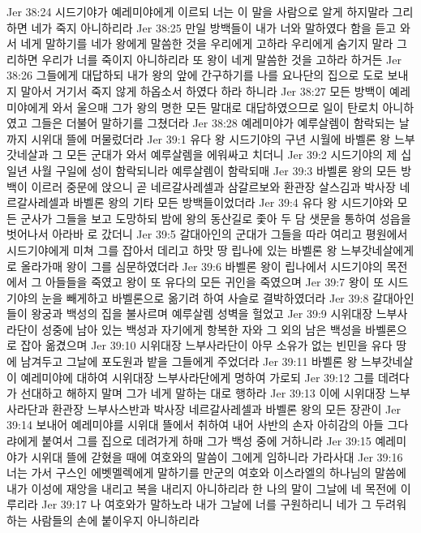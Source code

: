 Jer 38:24  시드기야가 예레미야에게 이르되 너는 이 말을 사람으로 알게 하지말라 그리하면 네가 죽지 아니하리라
Jer 38:25  만일 방백들이 내가 너와 말하였다 함을 듣고 와서 네게 말하기를 네가 왕에게 말씀한 것을 우리에게 고하라 우리에게 숨기지 말라 그리하면 우리가 너를 죽이지 아니하리라 또 왕이 네게 말씀한 것을 고하라 하거든
Jer 38:26  그들에게 대답하되 내가 왕의 앞에 간구하기를 나를 요나단의 집으로 도로 보내지 말아서 거기서 죽지 않게 하옵소서 하였다 하라 하니라
Jer 38:27  모든 방백이 예레미야에게 와서 울으매 그가 왕의 명한 모든 말대로 대답하였으므로 일이 탄로치 아니하였고 그들은 더불어 말하기를 그쳤더라
Jer 38:28  예레미야가 예루살렘이 함락되는 날까지 시위대 뜰에 머물렀더라
Jer 39:1  유다 왕 시드기야의 구년 시월에 바벨론 왕 느부갓네살과 그 모든 군대가 와서 예루살렘을 에워싸고 치더니
Jer 39:2  시드기야의 제 십일년 사월 구일에 성이 함락되니라 예루살렘이 함락되매
Jer 39:3  바벨론 왕의 모든 방백이 이르러 중문에 앉으니 곧 네르갈사레셀과 삼갈르보와 환관장 살스김과 박사장 네르갈사레셀과 바벨론 왕의 기타 모든 방백들이었더라
Jer 39:4  유다 왕 시드기야와 모든 군사가 그들을 보고 도망하되 밤에 왕의 동산길로 좇아 두 담 샛문을 통하여 성읍을 벗어나서 아라바 로 갔더니
Jer 39:5  갈대아인의 군대가 그들을 따라 여리고 평원에서 시드기야에게 미쳐 그를 잡아서 데리고 하맛 땅 립나에 있는 바벨론 왕 느부갓네살에게로 올라가매 왕이 그를 심문하였더라
Jer 39:6  바벨론 왕이 립나에서 시드기야의 목전에서 그 아들들을 죽였고 왕이 또 유다의 모든 귀인을 죽였으며
Jer 39:7  왕이 또 시드기야의 눈을 빼게하고 바벨론으로 옮기려 하여 사슬로 결박하였더라
Jer 39:8  갈대아인들이 왕궁과 백성의 집을 불사르며 예루살렘 성벽을 헐었고
Jer 39:9  시위대장 느부사라단이 성중에 남아 있는 백성과 자기에게 항복한 자와 그 외의 남은 백성을 바벨론으로 잡아 옮겼으며
Jer 39:10  시위대장 느부사라단이 아무 소유가 없는 빈민을 유다 땅에 남겨두고 그날에 포도원과 밭을 그들에게 주었더라
Jer 39:11  바벨론 왕 느부갓네살이 예레미야에 대하여 시위대장 느부사라단에게 명하여 가로되
Jer 39:12  그를 데려다가 선대하고 해하지 말며 그가 네게 말하는 대로 행하라
Jer 39:13  이에 시위대장 느부사라단과 환관장 느부사스반과 박사장 네르갈사레셀과 바벨론 왕의 모든 장관이
Jer 39:14  보내어 예레미야를 시위대 뜰에서 취하여 내어 사반의 손자 아히감의 아들 그다랴에게 붙여서 그를 집으로 데려가게 하매 그가 백성 중에 거하니라
Jer 39:15  예레미야가 시위대 뜰에 갇혔을 때에 여호와의 말씀이 그에게 임하니라 가라사대
Jer 39:16  너는 가서 구스인 에벳멜렉에게 말하기를 만군의 여호와 이스라엘의 하나님의 말씀에 내가 이성에 재앙을 내리고 복을 내리지 아니하리라 한 나의 말이 그날에 네 목전에 이루리라
Jer 39:17  나 여호와가 말하노라 내가 그날에 너를 구원하리니 네가 그 두려워하는 사람들의 손에 붙이우지 아니하리라
